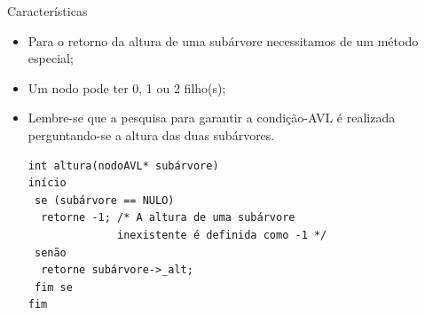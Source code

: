 \documentclass[12pt,table,xcolor={dvipsnames}]{beamer}
\begin{document}
\begin{frame}[fragile]{Características}
\begin{itemize}
\item Para o retorno da altura de uma subárvore necessitamos de um método especial;
\item Um nodo pode ter 0, 1 ou 2 filho(s);
\item Lembre-se que a pesquisa para garantir a condição-AVL é realizada perguntando-se a altura das duas subárvores.
\begin{lstlisting}
int altura(nodoAVL* subárvore) 
início                 
 se (subárvore == NULO)                         
  retorne -1; /* A altura de uma subárvore 
              inexistente é definida como -1 */
 senão                         
  retorne subárvore->_alt;                 
 fim se         
fim
\end{lstlisting}
\end{itemize}
\end{frame}
\end{document}
